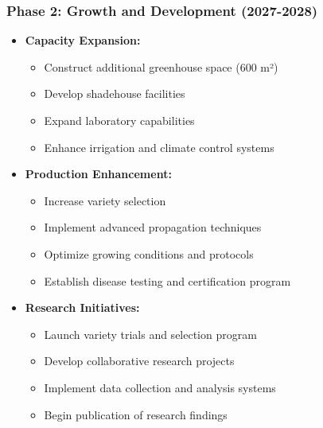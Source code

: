 \subsubsection{Phase 2: Growth and Development (2027-2028)}
\begin{itemize}
    \item \textbf{Capacity Expansion:}
    \begin{itemize}
        \item Construct additional greenhouse space (600 m²)
        \item Develop shadehouse facilities
        \item Expand laboratory capabilities
        \item Enhance irrigation and climate control systems
    \end{itemize}
    
    \item \textbf{Production Enhancement:}
    \begin{itemize}
        \item Increase variety selection
        \item Implement advanced propagation techniques
        \item Optimize growing conditions and protocols
        \item Establish disease testing and certification program
    \end{itemize}
    
    \item \textbf{Research Initiatives:}
    \begin{itemize}
        \item Launch variety trials and selection program
        \item Develop collaborative research projects
        \item Implement data collection and analysis systems
        \item Begin publication of research findings
    \end{itemize}
\end{itemize}


